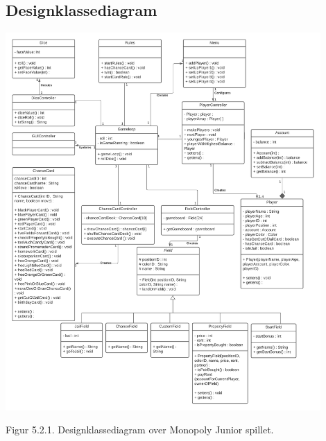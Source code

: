 \begin{flushleft}
\subsection{Designklassediagram}
\begin{center}
\includegraphics[width=0.9\textwidth]{Report/figures/Class Diagram.png}~\\[1cm]
\end{center}
Figur 5.2.1. Designklassediagram over Monopoly Junior spillet.
\end{flushleft}
